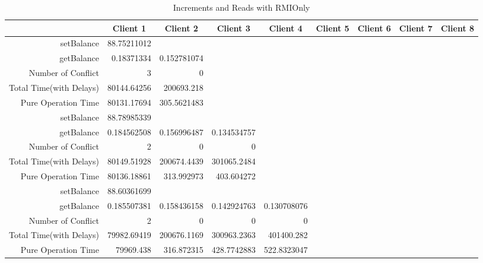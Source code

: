 \begin{landscape}
\begin{table}[htbp]
\scriptsize
  \centering
  \caption{Increments and Reads with RMIOnly}
    \begin{tabular}{rrrrrrrrr}
    \toprule
          & \multicolumn{1}{c}{Client 1} & \multicolumn{1}{c}{Client 2} & \multicolumn{1}{c}{Client 3} & \multicolumn{1}{c}{Client 4} & \multicolumn{1}{c}{Client 5} & \multicolumn{1}{c}{Client 6} & \multicolumn{1}{c}{Client 7} & \multicolumn{1}{c}{Client 8} \\
    \midrule
    setBalance & 88.75211012 &       &       &       &       &       &       &  \\
    getBalance & 0.18371334 & 0.152781074 &       &       &       &       &       &  \\
    Number of Conflict & 3     & 0     &       &       &       &       &       &  \\
    Total Time(with Delays) & 80144.64256 & 200693.218 &       &       &       &       &       &  \\
    Pure Operation Time & 80131.17694 & 305.5621483 &       &       &       &       &       &  \\
\cline{1-9}    
    setBalance & 88.78985339 &       &       &       &       &       &       &  \\
    getBalance & 0.184562508 & 0.156996487 & 0.134534757 &       &       &       &       &  \\
    Number of Conflict & 2     & 0     & 0     &       &       &       &       &  \\
    Total Time(with Delays) & 80149.51928 & 200674.4439 & 301065.2484 &       &       &       &       &  \\
    Pure Operation Time & 80136.18861 & 313.992973 & 403.604272 &       &       &       &       &  \\
\cline{1-9}    
    setBalance & 88.60361699 &       &       &       &       &       &       &  \\
    getBalance & 0.185507381 & 0.158436158 & 0.142924763 & 0.130708076 &       &       &       &  \\
    Number of Conflict & 2     & 0     & 0     & 0     &       &       &       &  \\
    Total Time(with Delays) & 79982.69419 & 200676.1169 & 300963.2363 & 401400.282 &       &       &       &  \\
    Pure Operation Time & 79969.438 & 316.872315 & 428.7742883 & 522.8323047 &       &       &       &  \\

\end{tabular}
\end{table}
\end{landscape}
